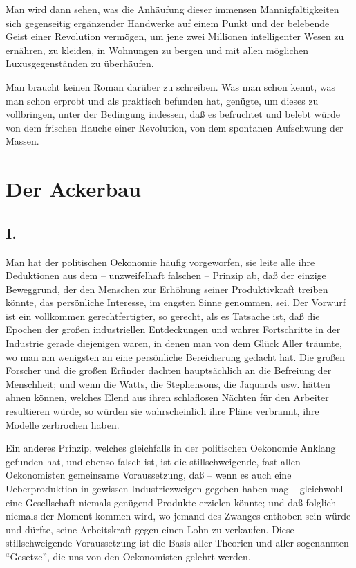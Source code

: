 \documentclass{scrbook}
\begin{document}
Man wird dann sehen, was die Anhäufung dieser immensen Mannigfaltigkeiten sich gegenseitig ergänzender Handwerke auf einem Punkt und der belebende Geist einer Revolution vermögen, um jene zwei Millionen intelligenter Wesen zu ernähren, zu kleiden, in Wohnungen zu bergen und mit allen möglichen Luxusgegenständen zu überhäufen.

Man braucht keinen Roman darüber zu schreiben. Was man schon kennt, was man schon erprobt und als praktisch befunden hat, genügte, um dieses zu vollbringen, unter der Bedingung indessen, daß es befruchtet und belebt würde von dem frischen Hauche einer Revolution, von dem spontanen Aufschwung der Massen.

\chapter{Der Ackerbau}
\section*{I.}

Man hat der politischen Oekonomie häufig vorgeworfen, sie leite alle ihre Deduktionen aus dem – unzweifelhaft falschen – Prinzip ab, daß der einzige Beweggrund, der den Menschen zur Erhöhung seiner Produktivkraft treiben könnte, das persönliche Interesse, im engsten Sinne genommen, sei. Der Vorwurf ist ein vollkommen gerechtfertigter, so gerecht, als es Tatsache ist, daß die Epochen der großen industriellen Entdeckungen und wahrer Fortschritte in der Industrie gerade diejenigen waren, in denen man von dem Glück Aller träumte, wo man am wenigsten an eine persönliche Bereicherung gedacht hat. Die großen Forscher und die großen Erfinder dachten hauptsächlich an die Befreiung der Menschheit; und wenn die Watts, die Stephensons, die Jaquards usw. hätten ahnen können, welches Elend aus ihren schlaflosen Nächten für den Arbeiter resultieren würde, so würden sie wahrscheinlich ihre Pläne verbrannt, ihre Modelle zerbrochen haben.

Ein anderes Prinzip, welches gleichfalls in der politischen Oekonomie Anklang gefunden hat, und ebenso falsch ist, ist die stillschweigende, fast allen Oekonomisten gemeinsame Voraussetzung, daß – wenn es auch eine Ueberproduktion in gewissen Industriezweigen gegeben haben mag – gleichwohl eine Gesellschaft niemals genügend Produkte erzielen könnte; und daß folglich niemals der Moment kommen wird, wo jemand des Zwanges enthoben sein würde und dürfte, seine Arbeitskraft gegen einen Lohn zu verkaufen. Diese stillschweigende Voraussetzung ist die Basis aller Theorien und aller sogenannten ``Gesetze'', die uns von den Oekonomisten gelehrt werden.
\end{document}
